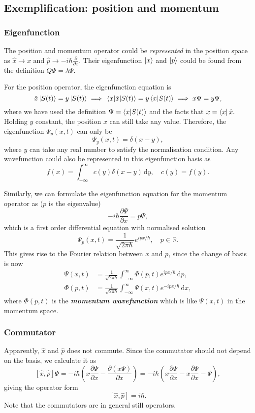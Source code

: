 \documentclass{article}
\theoremstyle{nonumberplain}
\begin{document}
\subsection{Exemplification: position and momentum}
\subsubsection{Eigenfunction}
The position and momentum operator could be \textit{represented} in the position space as $\hat{x} \to x $ and $\hat{p} \to  -i \hbar  \frac{\partial }{\partial x} $. Their eigenfunction $\ket{x}$ and $\ket{p}$ could be found from the definition $Q \Psi  = \lambda \Psi $. 

For the position operator, the eigenfunction equation is
\[
    \hat{x} \ket{S(t)} = y \ket{S(t)}
    \implies 
    \mel{x}{\hat{x} }{S(t)} = y \braket{x}{S(t)}
    \implies 
    x \Psi = y \Psi,
\]
where we have used the definition $\Psi = \braket{x}{S(t)}$ and the facts that $x = \bra{x} {\hat{x} }.$ Holding $y $ constant, the position $x$ can still take any value. Therefore, the eigenfunction $\Psi_{y }(x,t)$ can only be 
\[
    \Psi_{y }(x,t) = \delta (x-y ),
\]
where $y $ can take any real number to satisfy the normalisation condition. Any wavefunction could also be represented in this eigenfunction basis as 
\[
    f(x) = \int_{-\infty}^{\infty} c(y) \delta (x-y) \,\mathrm{d}y, \quad 
    c(y)= f(y). 
\]

Similarly, we can formulate the eigenfunction equation for the momentum operator as ($p$ is the eigenvalue)
\[
    -i \hbar \frac{\partial \Psi }{\partial x} = p \Psi,
\]
which is a first order differential equation with normalised solution 
\[
    \Psi_p(x,t) = 
    \frac{1}{\sqrt{2 \pi \hbar}} e^{i p x/\hbar}, \quad p \in \mathbb{R}.
\]
This gives rise to the Fourier relation between $x$ and $p$, since the change of basis is now 
\[
    \boxed{
    \begin{aligned}
        \Psi (x,t) &= \frac{1}{\sqrt{2\pi  \hbar } } \int_{-\infty}^{\infty} \Phi(p,t) e^{i p x/\hbar } \,\mathrm{d}p ,\\
        \Phi (p,t) &= \frac{1}{\sqrt{2\pi  \hbar } } \int_{-\infty}^{\infty} \Psi(x,t) e^{-i p x/\hbar} \,\mathrm{d}x,
    \end{aligned}}
\]
where $\Phi (p,t)$ is the \textit{\textbf{momentum wavefunction}} which is like $\Psi (x,t)$ in the momentum space. 

\subsubsection{Commutator}
Apparently, $\hat{x} $ and $\hat{p} $ does not commute. Since the commutator should not depend on the basis, we calculate it as 
\[
    [\hat{x} , \hat{p} ]\Psi  
    = -i \hbar ( x \frac{\partial \Psi }{\partial x} - \frac{\partial (x \Psi )}{\partial x} )
    = -i \hbar ( x \frac{\partial \Psi }{\partial x} - x \frac{\partial  \Psi }{\partial x} - \Psi ),
\]
giving the operator form 
\begin{equation} \label{eq:xp-commutator}
    \boxed{
        [\hat{x} , \hat{p} ] = i \hbar.
    }
\end{equation}
Note that the commutators are in general still operators. 
\end{document}
